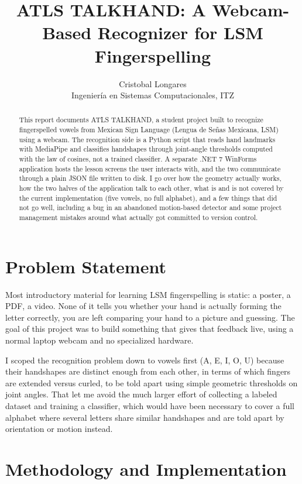 \documentclass[11pt]{article}
\title{ATLS TALKHAND: A Webcam-Based Recognizer for LSM Fingerspelling}
\author{Cristobal Longares \\ Ingenier\'ia en Sistemas Computacionales, ITZ}
\date{}
\begin{document}
\maketitle

\begin{abstract}
This report documents ATLS TALKHAND, a student project built to recognize fingerspelled vowels from Mexican Sign Language (Lengua de Se\~nas Mexicana, LSM) using a webcam. The recognition side is a Python script that reads hand landmarks with MediaPipe and classifies handshapes through joint-angle thresholds computed with the law of cosines, not a trained classifier. A separate .NET 7 WinForms application hosts the lesson screens the user interacts with, and the two communicate through a plain JSON file written to disk. I go over how the geometry actually works, how the two halves of the application talk to each other, what is and is not covered by the current implementation (five vowels, no full alphabet), and a few things that did not go well, including a bug in an abandoned motion-based detector and some project management mistakes around what actually got committed to version control.
\end{abstract}

\section{Problem Statement}

Most introductory material for learning LSM fingerspelling is static: a poster, a PDF, a video. None of it tells you whether your hand is actually forming the letter correctly, you are left comparing your hand to a picture and guessing. The goal of this project was to build something that gives that feedback live, using a normal laptop webcam and no specialized hardware.

I scoped the recognition problem down to vowels first (A, E, I, O, U) because their handshapes are distinct enough from each other, in terms of which fingers are extended versus curled, to be told apart using simple geometric thresholds on joint angles. That let me avoid the much larger effort of collecting a labeled dataset and training a classifier, which would have been necessary to cover a full alphabet where several letters share similar handshapes and are told apart by orientation or motion instead.

\section{Methodology and Implementation}
\end{document}
